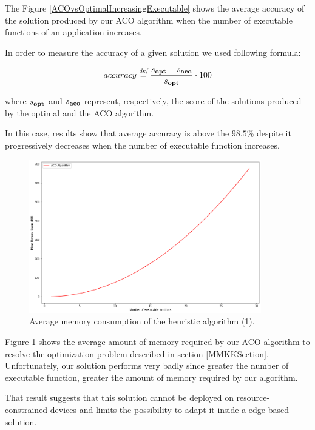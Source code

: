 \documentclass[12pt,a4paper]{report}
\newcommand{\mathDef}{\overset{\textit{def}}{=}}
\begin{document}
The Figure \ref{ACOvsOptimalIncreasingExecutable} shows the average accuracy of the solution produced by our ACO algorithm when the number of executable functions of an application increases. 

In order to measure the accuracy of a given solution we used following formula:

\begin{equation}
	accuracy \mathDef \dfrac{s_{\text{\textbf{opt}}} - s_{\text{\textbf{aco}}}}{s_{\text{\textbf{opt}}}} \cdot 100
\end{equation}

where $s_{\text{\textbf{opt}}}$ and $s_{\text{\textbf{aco}}}$ represent, respectively, the score of the solutions produced by the optimal and the ACO algorithm.

In this case, results show that average accuracy is above the $98.5$\% despite it progressively decreases when the number of executable function increases. 

\begin{figure}[h]
	\centering
	\includegraphics[width=0.9\textwidth]{./experiments/ACORamConsumptionIncreasingExecutable.png}
	\caption{Average memory consumption of the heuristic algorithm (1).}%
	\label{ACORamConsumptionIncreasingExecutable}
\end{figure}

Figure \ref{ACORamConsumptionIncreasingExecutable} shows the average amount of memory required by our ACO algorithm to resolve the optimization problem described in section \ref{MMKKSection}. Unfortunately, our solution performs very badly since greater the number of executable function, greater the amount of memory required by our algorithm. 

That result suggests that this solution cannot be deployed on resource-constrained devices and limits the possibility to adapt it inside a edge based solution.
\end{document}
